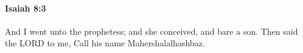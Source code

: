 
		\paragraph{Isaiah 8:3} %
			\label{ISAIAH-8-3}

			And I went unto the prophetess; and she conceived, and bare a son. Then said the LORD to me, Call his name Mahershalalhashbaz.


